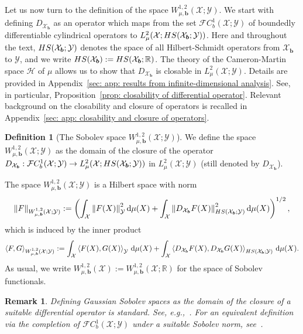 \documentclass[namedate,webpdf]{ima-authoring-template-blank}
\def\D{\,\mathrm{d}}
\newcommand*{\HS}{\textup{HS}}
\newcommand*{\nm}[1]{{\left\|#1\right \|}}
\newcommand*{\ip}[2]{\left\langle #1, #2 \right\rangle}
\newcounter{counter}
\numberwithin{counter}{section}
\numberwithin{equation}{section}
\theoremstyle{plain}
\newtheorem{remark}[counter]{Remark}
\theoremstyle{definition}
\newtheorem{definition}[counter]{Definition}
\newcommand*{\cF}{\mathcal{F}}
\newcommand*{\cH}{\mathcal{H}}
\newcommand*{\cX}{\mathcal{X}}
\newcommand*{\cY}{\mathcal{Y}}
\newcommand*{\bbR}{\mathbb{R}}
\theoremstyle{thmstyletwo}
\begin{document}
Let us now turn to the definition of the space \(W_{\mu, \bm{b}}^{1, 2}(\cX; \cY)\). We start with defining \(D_{\cX_{\bm{b}}}\) as an operator which maps from the set \(\cF C_b^1(\cX; \cY)\) of boundedly differentiable cylindrical operators to \(L_{\mu}^2(\cX; \HS(\cX_{\bm{b}}; \cY))\). Here and throughout the text, \( \HS(\cX_{\bm{b}}; \cY) \) denotes the space of all Hilbert-Schmidt operators from \( \cX_{\bm{b}} \) to \( \cY \), and we write \( \HS(\cX_{\bm{b}}) := \HS(\cX_{\bm{b}}; \bbR) \). The theory of the Cameron-Martin space \(\cH\) of \(\mu\) allows us to show that \(D_{\cX_{\bm{b}}}\) is closable in \(L_{\mu}^2(\cX; \cY)\). Details are provided in Appendix~\ref{sec: app: results from infinite-dimensional analysis}. See, in particular, Proposition~\ref{prop: closability of differential operator}. Relevant background on the closability and closure of operators is recalled in Appendix~\ref{sec: app: closability and closure of operators}.

\begin{definition}[The Sobolev space \(W_{\mu, \bm{b}}^{1,2}(\cX; \cY)\)]
\label{def: Gaussian Sobolev space}
    We define the space \(W_{\mu, \bm{b}}^{1,2}(\cX; \cY)\) as the domain of the closure of the operator \(D_{\cX_{\bm{b}}}: \cF C_b^1(\cX; \cY) \to L_{\mu}^2(\cX; \HS(\cX_{\bm{b}}; \cY))\) in \(L_{\mu}^2(\cX; \cY)\) (still denoted by \(D_{\cX_{\bm{b}}}\)).
\end{definition}

The space \(W_{\mu, \bm{b}}^{1,2}(\cX; \cY)\) is a Hilbert space with norm
\[
\nm{F}_{W_{\mu, \bm{b}}^{1,2}(\cX;\cY)} 
:= \left(\int_{\cX} \nm{F(X)}_{\cY}^2 \D \mu(X)
+ \int_{\cX} \nm{D_{\cX_{\bm{b}}} F(X)}_{\HS(\cX_{\bm{b}}; \cY)}^2 \D \mu(X)\right)^{1/2},
\]
which is induced by the inner product
\[
\ip{F}{G}_{W_{\mu, \bm{b}}^{1,2}(\cX; \cY)} 
:= \int_{\cX} \ip{F(X)}{G(X)}_{\cY} \D \mu(X) + \int_{\cX} \ip{D_{\cX_{\bm{b}}} F(X)}{D_{\cX_{\bm{b}}} G(X)}_{\HS(\cX_{\bm{b}};\cY)} \D \mu(X).
\]
As usual, we write \(W_{\mu, \bm{b}}^{1, 2}(\cX) := W_{\mu, \bm{b}}^{1, 2}(\cX; \bbR)\) for the space of Sobolev functionals.

\begin{remark}
    Defining Gaussian Sobolev spaces as the domain of the closure of a suitable differential operator is standard. See, e.g.,~\citet{chojnowska-michalik_GeneralizedOrnsteinUhlenbeckSemigroups_2001, daprato_IntroductionInfiniteDimensionalAnalysis_2006, daprato_IntroductionStochasticAnalysisMalliavin_2014, lunardi_InfiniteDimensionalAnalysis_2015}. For an equivalent definition via the completion of \(\cF C_b^1(\cX; \cY)\) under a suitable Sobolev norm, see~\citet[Ch. 5.2]{bogachev_GaussianMeasures_1998}.
\end{remark}
\end{document}
